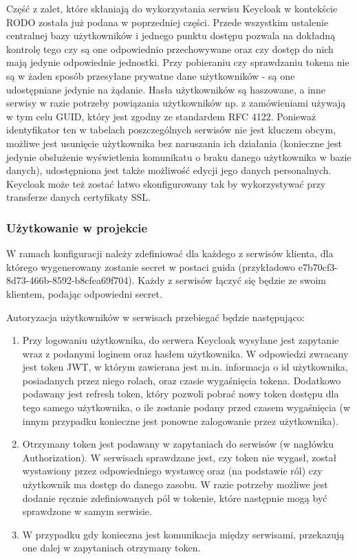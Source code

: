\documentclass[11pt,a4paper,twoside]{article}
\begin{document}
Część z zalet, które skłaniają do wykorzystania serwisu Keycloak w kontekście RODO została już podana w poprzedniej części. Przede wszystkim ustalenie centralnej bazy użytkowników i jednego punktu dostępu pozwala na dokładną kontrolę tego czy są one odpowiednio przechowywane oraz czy dostęp do nich mają jedynie odpowiednie jednostki. Przy pobieraniu czy sprawdzaniu tokena nie są w żaden sposób przesyłane prywatne dane użytkowników - są one udostępniane jedynie na żądanie. Hasła użytkowników są haszowane, a inne serwisy w razie potrzeby powiązania użytkowników np. z zamówieniami używają w tym celu GUID, który jest zgodny ze standardem RFC 4122. Ponieważ identyfikator ten w tabelach poszczególnych serwisów nie jest kluczem obcym, możliwe jest usunięcie użytkownika bez naruszania ich działania (konieczne jest jedynie obsłużenie wyświetlenia komunikatu o braku danego użytkownika w bazie danych), udostępniona jest także możliwość edycji jego danych personalnych. Keycloak może też zostać łatwo skonfigurowany tak by wykorzystywać przy transferze danych certyfikaty SSL.

\subsubsection{Użytkowanie w projekcie}

W ramach konfiguracji należy zdefiniować dla każdego z serwisów klienta, dla którego wygenerowany zostanie secret w postaci guida (przykładowo e7b70cf3-8d73-466b-8592-b8cfea69f704). Każdy z serwisów łączyć się będzie ze swoim klientem, podając odpowiedni secret.

Autoryzacja użytkowników w serwisach przebiegać będzie następująco:
\begin{enumerate}
\item Przy logowaniu użytkownika, do serwera Keycloak wysyłane jest zapytanie wraz z podanymi loginem oraz hasłem użytkownika. W odpowiedzi zwracany jest token JWT, w którym zawierana jest m.in. informacja o id użytkownika, posiadanych przez niego rolach, oraz czasie wygaśnięcia tokena. Dodatkowo podawany jest refresh token, który pozwoli pobrać nowy token dostępu dla tego samego użytkownika, o ile zostanie podany przed czasem wygaśnięcia (w innym przypadku konieczne jest ponowne zalogowanie przez użytkownika).
\item Otrzymany token jest podawany w zapytaniach do serwisów (w nagłówku Authorization). W serwisach sprawdzane jest, czy token nie wygasł, został wystawiony przez odpowiedniego wystawcę oraz (na podstawie ról) czy użytkownik ma dostęp do danego zasobu. W razie potrzeby możliwe jest dodanie ręcznie zdefiniowanych pól w tokenie, które następnie mogą być sprawdzone w samym serwisie.
\item W przypadku gdy konieczna jest komunikacja między serwisami, przekazują one dalej w zapytaniach otrzymany token.
\end{enumerate}
\end{document}
